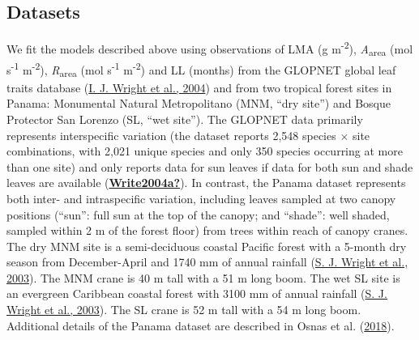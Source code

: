 \documentclass[
  12pt,
  a4paper,
,tablecaptionabove
]{scrartcl}
\begin{document}
\hypertarget{datasets}{%
\subsection{Datasets}\label{datasets}}

We fit the models described above using observations of LMA (g
m\textsuperscript{-2}), \emph{A}\textsubscript{area} (mol
s\textsuperscript{-1} m\textsuperscript{-2}),
\emph{R}\textsubscript{area} (mol s\textsuperscript{-1}
m\textsuperscript{-2}) and LL (months) from the GLOPNET global leaf
traits database (\protect\hyperlink{ref-Wright2004a}{I. J. Wright et
al., 2004}) and from two tropical forest sites in Panama: Monumental
Natural Metropolitano (MNM, ``dry site'') and Bosque Protector San
Lorenzo (SL, ``wet site''). The GLOPNET data primarily represents
interspecific variation (the dataset reports 2,548 species \(\times\)
site combinations, with 2,021 unique species and only 350 species
occurring at more than one site) and only reports data for sun leaves if
data for both sun and shade leaves are available
(\protect\hyperlink{ref-Write2004a}{\textbf{Write2004a?}}). In contrast,
the Panama dataset represents both inter- and intraspecific variation,
including leaves sampled at two canopy positions (``sun'': full sun at
the top of the canopy; and ``shade'': well shaded, sampled within 2 m of
the forest floor) from trees within reach of canopy cranes. The dry MNM
site is a semi-deciduous coastal Pacific forest with a 5-month dry
season from December-April and 1740 mm of annual rainfall
(\protect\hyperlink{ref-Wright2003}{S. J. Wright et al., 2003}). The MNM
crane is 40 m tall with a 51 m long boom. The wet SL site is an
evergreen Caribbean coastal forest with 3100 mm of annual rainfall
(\protect\hyperlink{ref-Wright2003}{S. J. Wright et al., 2003}). The SL
crane is 52 m tall with a 54 m long boom. Additional details of the
Panama dataset are described in Osnas et al.
(\protect\hyperlink{ref-Osnas2018}{2018}).
\end{document}
